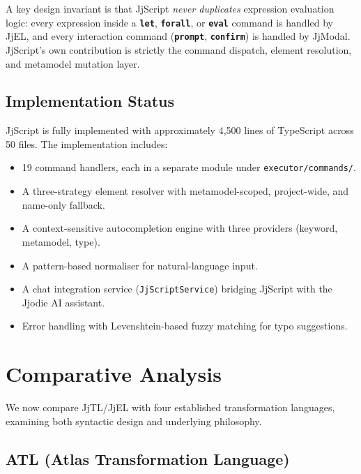 \documentclass[11pt,a4paper]{article}
\newcommand{\jjmodal}{\textsf{JjModal}}
\newcommand{\jjscript}{\textsf{JjScript}}
\newcommand{\jjel}{\textsf{JjEL}}
\newcommand{\jjtl}{\textsf{JjTL}}
\newcommand{\kw}[1]{\texttt{\textbf{#1}}}
\begin{document}
A key design invariant is that \jjscript{} \emph{never duplicates}
expression evaluation logic: every expression inside a \kw{let},
\kw{forall}, or \kw{eval} command is handled by \jjel{}, and every
interaction command (\kw{prompt}, \kw{confirm}) is handled by \jjmodal{}.
\jjscript{}'s own contribution is strictly the command dispatch, element
resolution, and metamodel mutation layer.


\subsection{Implementation Status}

\jjscript{} is fully implemented with approximately 4{,}500 lines of
TypeScript across 50 files. The implementation includes:

\begin{itemize}
    \item 19 command handlers, each in a separate module under
          \texttt{executor/commands/}.
    \item A three-strategy element resolver with metamodel-scoped,
          project-wide, and name-only fallback.
    \item A context-sensitive autocompletion engine with three providers
          (keyword, metamodel, type).
    \item A pattern-based normaliser for natural-language input.
    \item A chat integration service (\texttt{JjScriptService}) bridging
          \jjscript{} with the Jjodie AI assistant.
    \item Error handling with Levenshtein-based fuzzy matching for typo
          suggestions.
\end{itemize}


\section{Comparative Analysis}\label{sec:comparison}

We now compare \jjtl{}/\jjel{} with four established transformation languages, examining both syntactic design and underlying philosophy.

\subsection{ATL (Atlas Transformation Language)}
\end{document}
